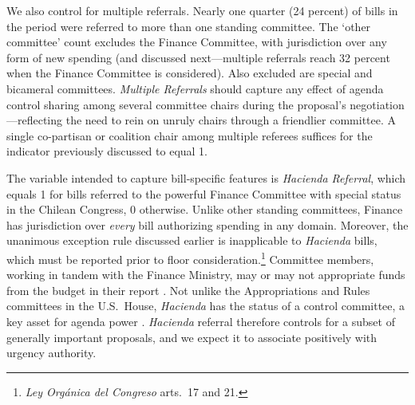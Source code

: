\documentclass[letter,12pt]{article}
\begin{document}
We also control for multiple referrals. Nearly one quarter (24 percent) of bills in the period were referred to more than one standing committee. The `other committee' count excludes the Finance Committee, with jurisdiction over any form of new spending (and discussed next---multiple referrals reach 32 percent when the Finance Committee is considered). Also excluded are special and bicameral committees. \emph{Multiple Referrals} should capture any effect of agenda control sharing among several committee chairs during the proposal's negotiation---reflecting the need to rein on unruly chairs through a friendlier committee. A single co-partisan or coalition chair among multiple referees suffices for the indicator previously discussed to equal 1. 

The variable intended to capture bill-specific features is \emph{Hacienda Referral}, which equals 1 for bills referred to the powerful Finance Committee with special status in the Chilean Congress, 0 otherwise. Unlike other standing committees, Finance has jurisdiction over \emph{every} bill authorizing spending in any domain. Moreover, the unanimous exception rule discussed earlier is inapplicable to \emph{Hacienda} bills, which must be reported prior to floor consideration.\footnote{\emph{Ley Orgánica del Congreso} arts.\ 17 and 21.} Committee members, working in tandem with the Finance Ministry, may or may not appropriate funds from the budget in their report \citep{aleman.navia.UrgChi.2009}. Not unlike the Appropriations and Rules committees in the U.S.\ House, \emph{Hacienda} has the status of a control committee, a key asset for agenda power \citep{kiewiet.mccubbins.1991}. \emph{Hacienda} referral therefore controls for a subset of generally important proposals, and we expect it to associate positively with urgency authority.
\end{document}
